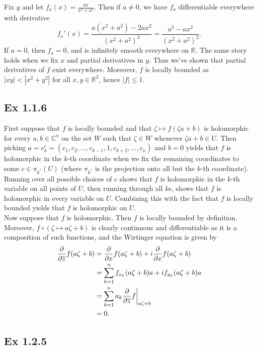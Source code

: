 \documentclass{article}
\newcommand\restr[2]{{%
  \left.\kern-\nulldelimiterspace %
  #1 %
  \vphantom{\big|} %
  \right|_{#2} %
  }}
\theoremstyle{definition}
\newcommand{\R}{\mathbb{R}}
\newcommand{\C}{\mathbb{C}}
\begin{document}
Fix $y$ and let $f_a(x) = \frac{ax}{x^2 + a^2}$. Then if $a \not = 0$, we have
$f_a$ differentiable everywhere with derivative
\[
	f_a'(x) 
	= 
	\frac{a(x^2 + a^2) - 2ax^2}{(x^2 + a^2)^2}
	= 
	\frac{a^3 - ax^2}{(x^2 + a^2)^2}.
\]
If $a = 0$, then $f_a = 0$, and is infinitely smooth everywhere on $\R$. The
same story holds when we fix $x$ and partial derivatives in $y$. Thus we've
shown that partial derivatives of $f$ exist everywhere. Moreover, $f$ is
locally bounded as $|xy| < |x^2 + y^2|$ for all $x, y \in \R^2$, hence $|f|
\leq 1$.

\subsection*{Ex 1.1.6}

First suppose that $f$ is locally bounded and that $\zeta \mapsto f(\zeta a +
b)$ is holomorphic for every $a,b \in \C^n$ on the set $W$ such that $\zeta \in
W$ whenever $\zeta a + b \in U$. Then picking $a = e_k^{c} = (c_1, c_2, \ldots,
c_{k - 1}, 1, c_{k + 2}, \ldots, c_n)$ and $b = 0$ yields that $f$ is
holomorphic in the $k$-th coordinate when we fix the remaining coordinates to
some $c \in \pi_{k^*}(U)$ (where $\pi_{k^{*}}$ is the projection onto all but
the $k$-th coordinate). Running over all possible choices of $c$ shows that
$f$ is holomorphic in the $k$-th variable on all points of $U$, then running
through all $k$s, shows that $f$ is holomorphic in every variable on $U$.
Combining this with the fact that $f$ is locally bounded yields that $f$ is
holomorphic on $U$. \\

Now suppose that $f$ is holomorphic. Then $f$ is locally bounded by definition.
Moreover, $f \circ (\zeta \mapsto a\zeta + b)$ is clearly continuous and differentiable
as it is a composition of such functions, and the Wirtinger equation is given by
\begin{align*}
	\frac{\partial}{\partial \overline{z}} f (a\zeta + b)
	&=
	\frac{\partial}{\partial x} 
	f (a\zeta + b) 
	+
	i
	\frac{\partial}{\partial x} 
	f (a\zeta + b) \\
	&=
	\sum_{k = 1}^{n}
	f_{x_k} (a\zeta + b) 
	a
	+
	i f_{y_k} (a\zeta + b)
	a \\
	&=
	\sum_{k = 1}^{n}
	\restr{a_k \frac{\partial}{\partial \overline{z}} f}{a\zeta + b} \\
	&=
	0.
\end{align*}


\subsection*{Ex 1.2.5}
\end{document}

